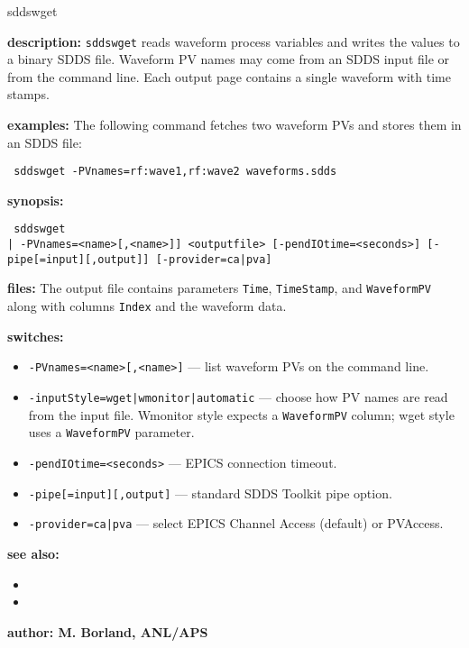 \begin{sddsprog}{sddswget}
\item {\bf description:}
  \verb+sddswget+ reads waveform process variables and writes the values to a binary SDDS file.  Waveform PV names may come from an SDDS input file or from the command line.  Each output page contains a single waveform with time stamps.

\item {\bf examples:}
  The following command fetches two waveform PVs and stores them in an SDDS file:
  \begin{flushleft}{\tt
  sddswget -PVnames=rf:wave1,rf:wave2 waveforms.sdds
  }\end{flushleft}

\item {\bf synopsis:}
  \begin{flushleft}{\tt
  sddswget\\\relax
      [<inputfile> [-inputStyle={wget|wmonitor|automatic}] | -PVnames=<name>[,<name>]]\
      <outputfile> [-pendIOtime=<seconds>] [-pipe[=input][,output]]\
      [-provider={ca|pva}]\
  }\end{flushleft}

\item {\bf files:}
  The output file contains parameters \verb+Time+, \verb+TimeStamp+, and \verb+WaveformPV+ along with columns \verb+Index+ and the waveform data.

\item {\bf switches:}
  \begin{itemize}
    \item {\tt -PVnames=<name>[,<name>]} --- list waveform PVs on the command line.
    \item {\tt -inputStyle={wget|wmonitor|automatic}} --- choose how PV names are read from the input file.  Wmonitor style expects a \verb+WaveformPV+ column; wget style uses a \verb+WaveformPV+ parameter.
    \item {\tt -pendIOtime=<seconds>} --- EPICS connection timeout.
    \item {\tt -pipe[=input][,output]} --- standard SDDS Toolkit pipe option.
    \item {\tt -provider={ca|pva}} --- select EPICS Channel Access (default) or PVAccess.
  \end{itemize}

\item {\bf see also:}
  \begin{itemize}
    \item {}
    \item {}
  \end{itemize}

\item {\bf author: M. Borland, ANL/APS}
\end{sddsprog}
